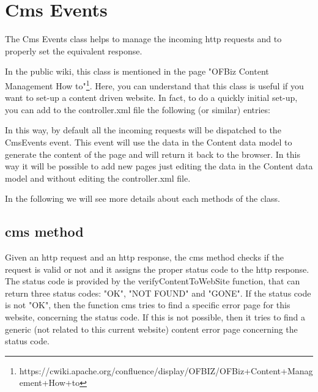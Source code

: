 \section{Cms Events}

The Cms Events class helps to manage the incoming http requests and to properly set the equivalent response.

In the public wiki, this class is mentioned in the page "OFBiz Content Management How to"\footnote{https://cwiki.apache.org/confluence/display/OFBIZ/OFBiz+Content+Management+How+to}. Here, you can understand that this class is useful if you want to set-up a content driven website. In fact, to do a quickly initial set-up, you can add to the controller.xml file the following (or similar) entries:

    
    
In this way, by default all the incoming requests will be dispatched to the CmsEvents event.
This event will use the data in the Content data model to generate the content of the page and will return it back to the browser.
In this way it will be possible to add new pages just editing the data in the Content data model and without editing the controller.xml file.

In the following we will see more details about each methods of the class. 

\subsection{cms method}

Given an http request and an http response, the cms method checks if the request is valid or not and it assigns the proper status code to the http response.
The status code is provided by the verifyContentToWebSite function, that can return three status codes: "OK", "NOT FOUND" and "GONE".
If the status code is not "OK", then the function cms tries to find a specific error page for this website, concerning the status code.
If this is not possible, then it tries to find a generic (not related to this current website) content error page concerning the status code.

